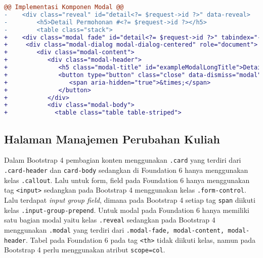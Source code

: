 \begin{lstlisting}[language=diff, caption=Perubahan file \path{\views\PerubahanKuliahRequest\main.php} , label=Entri, basicstyle=\ttfamily, frame=single,
columns=fullflexible, keepspaces=true, breaklines=true]
@@ Implementasi Komponen Modal @@
-    <div class="reveal" id="detail<?= $request->id ?>" data-reveal>
-        <h5>Detail Permohonan #<?= $request->id ?></h5>
-        <table class="stack">
+    <div class="modal fade" id="detail<?= $request->id ?>" tabindex="-1" role="dialog" aria-hidden="true">
+     <div class="modal-dialog modal-dialog-centered" role="document">
+        <div class="modal-content">
+           <div class="modal-header">
+              <h5 class="modal-title" id="exampleModalLongTitle">Detail Permohonan #<?= $request->id ?></h5>
+              <button type="button" class="close" data-dismiss="modal" aria-label="Close">
+                 <span aria-hidden="true">&times;</span>
+              </button>
+           </div>
+           <div class="modal-body">
+             <table class="table table-striped">
\end{lstlisting}

\subsection{Halaman Manajemen Perubahan Kuliah}
Dalam Bootstrap 4 pembagian konten menggunakan \texttt{.card} yang terdiri dari \texttt{.card-header} dan \texttt{card-body} sedangkan di Foundation 6 hanya menggunakan kelas \texttt{.callout}. 
Lalu untuk form, field pada Foundation 6 hanya menggunakan tag \texttt{<input>} sedangkan pada Bootstrap 4 menggunakan kelas \texttt{.form-control}.
Lalu terdapat \textit{input group field}, dimana pada Bootstrap 4 setiap tag \texttt{span} diikuti kelas \texttt{.input-group-prepend}.
Untuk modal pada Foundation 6 hanya memiliki satu bagian modal yaitu kelas \texttt{.reveal} sedangkan pada Bootstrap 4 menggunakan \texttt{.modal} yang terdiri dari \texttt{.modal-fade, modal-content, modal-header}.
Tabel pada Foundation 6 pada tag \texttt{<th>} tidak diikuti kelas, namun pada Bootstrap 4 perlu menggunakan atribut \texttt{scope=col}.

